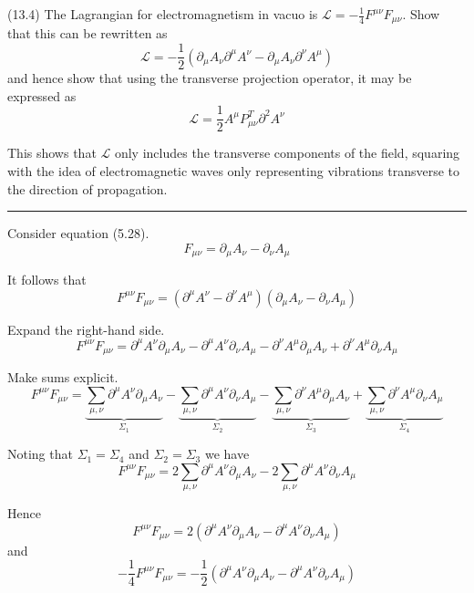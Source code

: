 \documentclass[12pt]{article}
\begin{document}
(13.4)
The Lagrangian for electromagnetism in vacuo is
$\mathcal L=-\frac{1}{4}F^{\mu\nu}F_{\mu\nu}$.
Show that this can be rewritten as
\begin{equation*}
\mathcal L=-\frac{1}{2}
\left(\partial_\mu A_\nu\partial^\mu A^\nu
-\partial_\mu A_\nu\partial^\nu A^\mu\right)
\tag{13.42}
\end{equation*}
and hence show that using the transverse projection
operator, it may be expressed as
\begin{equation*}
\mathcal L=\frac{1}{2}A^\mu P_{\mu\nu}^T\partial^2A^\nu
\tag{13.43}
\end{equation*}

This shows that $\mathcal L$ only includes the transverse
components of the field, squaring with the idea of
electromagnetic waves only representing vibrations
transverse to the direction of propagation.

\bigskip
\hrule

\bigskip
Consider equation (5.28).
\begin{equation*}
F_{\mu\nu}=\partial_\mu A_\nu-\partial_\nu A_\mu
\tag{5.28}
\end{equation*}

It follows that
\begin{equation*}
F^{\mu\nu}F_{\mu\nu}=(\partial^\mu A^\nu-\partial^\nu A^\mu)(\partial_\mu A_\nu-\partial_\nu A_\mu)
\end{equation*}

Expand the right-hand side.
\begin{equation*}
F^{\mu\nu}F_{\mu\nu}
=\partial^\mu A^\nu\partial_\mu A_\nu
-\partial^\mu A^\nu\partial_\nu A_\mu
-\partial^\nu A^\mu\partial_\mu A_\nu
+\partial^\nu A^\mu\partial_\nu A_\mu
\end{equation*}

Make sums explicit.
\begin{equation*}
F^{\mu\nu}F_{\mu\nu}
=\underbrace{\sum_{\mu,\nu}\partial^\mu A^\nu\partial_\mu A_\nu}_{\Sigma_1}
-\underbrace{\sum_{\mu,\nu}\partial^\mu A^\nu\partial_\nu A_\mu}_{\Sigma_2}
-\underbrace{\sum_{\mu,\nu}\partial^\nu A^\mu\partial_\mu A_\nu}_{\Sigma_3}
+\underbrace{\sum_{\mu,\nu}\partial^\nu A^\mu\partial_\nu A_\mu}_{\Sigma_4}
\end{equation*}

Noting that $\Sigma_1=\Sigma_4$ and $\Sigma_2=\Sigma_3$ we have
\begin{equation*}
F^{\mu\nu}F_{\mu\nu}
=2\sum_{\mu,\nu}\partial^\mu A^\nu\partial_\mu A_\nu
-2\sum_{\mu,\nu}\partial^\mu A^\nu\partial_\nu A_\mu
\end{equation*}

Hence
\begin{equation*}
F^{\mu\nu}F_{\mu\nu}
=2\left(\partial^\mu A^\nu\partial_\mu A_\nu-\partial^\mu A^\nu\partial_\nu A_\mu\right)
\end{equation*}
and
\begin{equation*}
-\frac{1}{4}F^{\mu\nu}F_{\mu\nu}
=-\frac{1}{2}\left(\partial^\mu A^\nu\partial_\mu A_\nu-\partial^\mu A^\nu\partial_\nu A_\mu\right)
\end{equation*}

\end{document}
